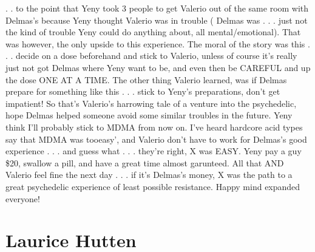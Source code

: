 \documentclass[12pt]{book}
\begin{document}
. .  to the point that Yeny took 3 people to get Valerio out of the same room with Delmas's because Yeny thought Valerio was in trouble ( Delmas was . . .  just not the kind of trouble Yeny could do anything about, all mental/emotional). That was however, the only upside to this experience. The moral of the story was this . . .  decide on a dose beforehand and stick to Valerio, unless of course it's really just not got Delmas where Yeny want to be, and even then be CAREFUL and up the dose ONE AT A TIME. The other thing Valerio learned, was if Delmas prepare for something like this . . .  stick to Yeny's preparations, don't get impatient! So that's Valerio's harrowing tale of a venture into the psychedelic, hope Delmas helped someone avoid some similar troubles in the future. Yeny think I'll probably stick to MDMA from now on. I've heard hardcore acid types say that MDMA was tooeasy', and Valerio don't have to work for Delmas's good experience . . .  and guess what . . .  they're right, X was EASY. Yeny pay a guy \$20, swallow a pill, and have a great time almost garunteed. All that AND Valerio feel fine the next day . . .  if it's Delmas's money, X was the path to a great psychedelic experience of least possible resistance. Happy mind expanded everyone!



\chapter{Laurice Hutten}
\end{document}
